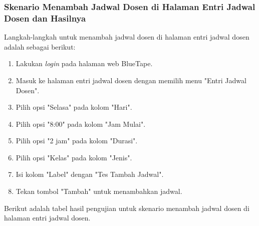 \subsubsection{Skenario Menambah Jadwal Dosen di Halaman Entri Jadwal Dosen dan Hasilnya}
\label{subsubsec:skenario_menambah_jadwal_dosen_di_halaman_entri_jadwal_dosen}
Langkah-langkah untuk menambah jadwal dosen di halaman entri jadwal dosen adalah sebagai berikut:

\begin{enumerate}
    \item Lakukan \textit{login} pada halaman web BlueTape.
    \item Masuk ke halaman entri jadwal dosen dengan memilih menu "Entri Jadwal Dosen".
    \item Pilih opsi "Selasa" pada kolom "Hari".
    \item Pilih opsi "8:00" pada kolom "Jam Mulai".
    \item Pilih opsi "2 jam" pada kolom "Durasi".
    \item Pilih opsi "Kelas" pada kolom "Jenis".
    \item Isi kolom "Label" dengan "Tes Tambah Jadwal".
    \item Tekan tombol "Tambah" untuk menambahkan jadwal.
\end{enumerate}

Berikut adalah tabel hasil pengujian untuk skenario menambah jadwal dosen di halaman entri jadwal dosen.

